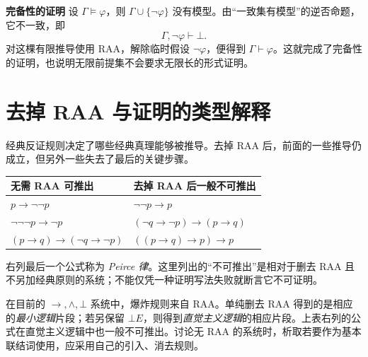 \documentclass[lang=cn,a4paper,fontset=none,zihao=false,10pt,openany,twoside]{beautybook}
\numberwithin{algorithm}{chapter}
\begin{document}
\par\smallskip\noindent\textbf{完备性的证明}\quad
设 $\Gamma\models\varphi$，则 $\Gamma\cup\{\neg\varphi\}$ 没有模型。由“一致集有模型”的逆否命题，它不一致，即
\[
 \Gamma,\neg\varphi\vdash\bot.
\]
对这棵有限推导使用 RAA，解除临时假设 $\neg\varphi$，便得到 $\Gamma\vdash\varphi$。这就完成了完备性的证明，也说明无限前提集不会要求无限长的形式证明。

\section{去掉 RAA 与证明的类型解释}\label{sec:intuitionistic-types}
经典反证规则决定了哪些经典真理能够被推导。去掉 RAA 后，前面的一些推导仍成立，但另外一些失去了最后的关键步骤。
\begin{center}
\begin{tabular}{ll}
\toprule
无需 RAA 可推出&去掉 RAA 后一般不可推出\\\midrule
$p\to\neg\neg p$&$\neg\neg p\to p$\\
$\neg\neg\neg p\to\neg p$&$(\neg q\to\neg p)\to(p\to q)$\\
$(p\to q)\to(\neg q\to\neg p)$&$((p\to q)\to p)\to p$\\
\bottomrule
\end{tabular}
\end{center}
右列最后一个公式称为 \emph{Peirce 律}。这里列出的“不可推出”是相对于删去 RAA 且不另加经典原则的系统；不能仅凭一种证明写法失败就断言它不可证明。

\begin{remark}
在目前的 $\to,\wedge,\bot$ 系统中，爆炸规则来自 RAA。单纯删去 RAA 得到的是相应的\emph{最小逻辑}片段；若另保留 $\bot E$，则得到\emph{直觉主义逻辑}的相应片段。上表右列的公式在直觉主义逻辑中也一般不可推出。讨论无 RAA 的系统时，析取若要作为基本联结词使用，应采用自己的引入、消去规则。
\end{remark}
\end{document}
